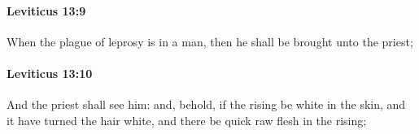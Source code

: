 		\paragraph{Leviticus 13:9} %
			\label{LEVITICUS-13-9}

			When the plague of leprosy is in a man, then he shall be brought unto the priest;


		\paragraph{Leviticus 13:10} %
			\label{LEVITICUS-13-10}

			And the priest shall see him: and, behold, if the rising be white in the skin, and it have turned the hair white, and there be quick raw flesh in the rising;


